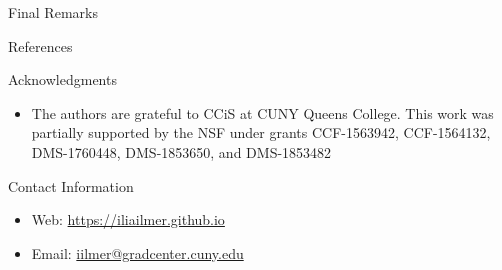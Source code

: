 \documentclass[final,hyperref={pdfpagelabels=false}]{beamer}
\begin{document}
\begin{frame}[t]
\begin{columns}[t]
\begin{column}{.465\textwidth}
\begin{block}{Final Remarks}
            \end{block}


            \begin{block}{References}

                \small{%
                    \printbibliography{}}

            \end{block}


            \begin{block}{Acknowledgments}

                \begin{itemize}
                    \item The authors are grateful to CCiS at CUNY Queens College. This work was partially supported by the NSF under grants CCF-1563942, CCF-1564132, DMS-1760448, DMS-1853650, and DMS-1853482

                \end{itemize}

            \end{block}



            \begin{block}{Contact Information}

                \begin{itemize}
                    \item Web: \href{https://iliailmer.github.io}{https://iliailmer.github.io}
                    \item Email: \href{mailto:iilmer@gradcenter.cuny.edu}{iilmer@gradcenter.cuny.edu}
                \end{itemize}


\end{block}
\end{column}
\end{columns}
\end{frame}
\end{document}
